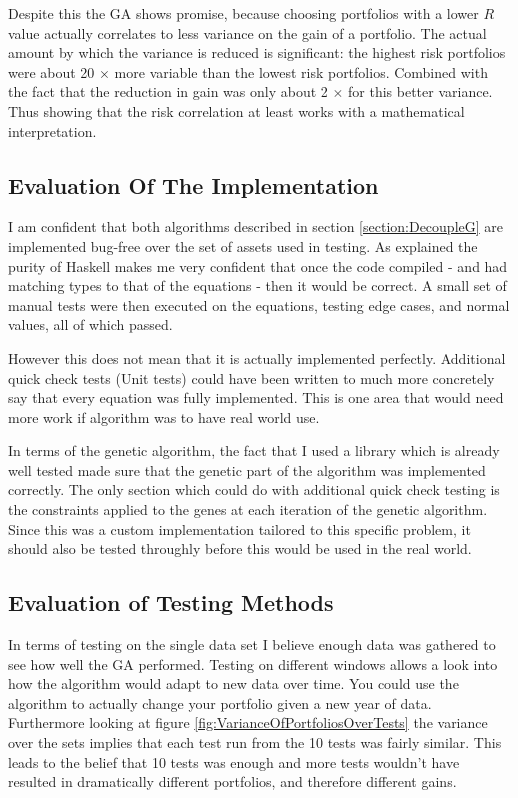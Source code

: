 \documentclass[11pt]{article}
\begin{document}
    Despite this the GA shows promise, because choosing portfolios
    with a lower \(R\) value actually correlates to less variance on the gain
    of a portfolio. The actual amount by which the variance is reduced
    is significant: the highest risk portfolios were about 20 \(\times\) more
    variable than the lowest risk portfolios. Combined with the fact that the
    reduction in gain was only about 2 \(\times\) for this better
    variance. Thus showing that the risk correlation at least works with a mathematical
    interpretation.

\subsection{Evaluation Of The Implementation}

    I am confident that both algorithms described in section \ref{section:DecoupleG}
    are implemented bug-free over the set of assets used in testing. As explained
    the purity of Haskell makes me very confident that once the code compiled - and
    had matching types to that of the equations - then it would be correct. A small
    set of manual tests were then executed on the equations, testing edge cases,
    and normal values, all of which passed.

    However this does not mean that it is actually implemented perfectly. Additional
    quick check tests \cite{QuickCheck} (Unit tests) could have been written to
    much more concretely say that every equation was fully implemented. This is
    one area that would need more work if algorithm was to have real world use.

    In terms of the genetic algorithm, the fact that I used a library \cite{Moo}
    which is already well tested made sure that the genetic part of the algorithm
    was implemented correctly. The only section which could do with additional
    quick check testing is the constraints applied to the genes at each iteration
    of the genetic algorithm. Since this was a custom implementation tailored to
    this specific problem, it should also be tested throughly before this
    would be used in the real world.

\subsection{Evaluation of Testing Methods}

    In terms of testing on the single data set \cite{Dataset} I believe enough
    data was gathered to see how well the GA performed. Testing on different
    windows allows a look into how the algorithm would adapt to new data over time.
    You could use the algorithm to actually change your portfolio given a
    new year of data. Furthermore looking at figure \ref{fig:VarianceOfPortfoliosOverTests}
    the variance over the sets implies that each test run from the 10 tests was
    fairly similar. This leads to the belief that 10 tests was enough and more tests
    wouldn't have resulted in dramatically different portfolios, and therefore
    different gains.
\end{document}
